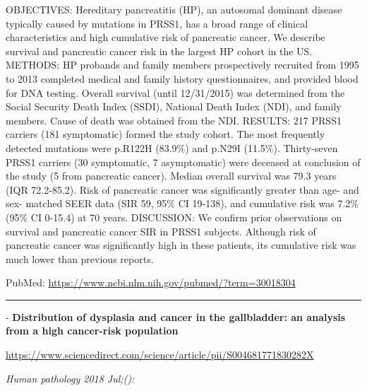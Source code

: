 \documentclass[]{article}
\begin{document}
OBJECTIVES: Hereditary pancreatitis (HP), an autosomal dominant disease
typically caused by mutations in PRSS1, has a broad range of clinical
characteristics and high cumulative risk of pancreatic cancer. We
describe survival and pancreatic cancer risk in the largest HP cohort in
the US. METHODS: HP probands and family members prospectively recruited
from 1995 to 2013 completed medical and family history questionnaires,
and provided blood for DNA testing. Overall survival (until 12/31/2015)
was determined from the Social Security Death Index (SSDI), National
Death Index (NDI), and family members. Cause of death was obtained from
the NDI. RESULTS: 217 PRSS1 carriers (181 symptomatic) formed the study
cohort. The most frequently detected mutations were p.R122H (83.9\%) and
p.N29I (11.5\%). Thirty-seven PRSS1 carriers (30 symptomatic, 7
asymptomatic) were deceased at conclusion of the study (5 from
pancreatic cancer). Median overall survival was 79.3 years (IQR
72.2-85.2). Risk of pancreatic cancer was significantly greater than
age- and sex- matched SEER data (SIR 59, 95\% CI 19-138), and cumulative
risk was 7.2\% (95\% CI 0-15.4) at 70 years. DISCUSSION: We confirm
prior observations on survival and pancreatic cancer SIR in PRSS1
subjects. Although risk of pancreatic cancer was significantly high in
these patients, its cumulative risk was much lower than previous
reports.

PubMed: \url{https://www.ncbi.nlm.nih.gov/pubmed/?term=30018304}

{}

{}

\begin{center}\rule{0.5\linewidth}{\linethickness}\end{center}

 - \textbf{Distribution of dysplasia and cancer in the gallbladder: an
analysis from a high cancer-risk population}

\url{https://www.sciencedirect.com/science/article/pii/S004681771830282X}

\emph{Human pathology 2018 Jul;():}
\end{document}
